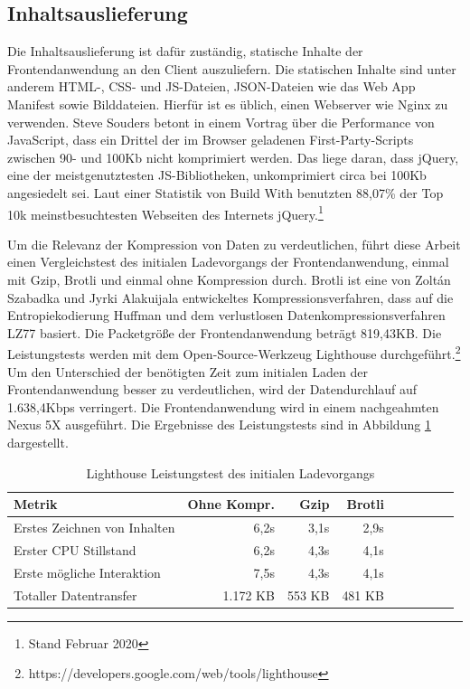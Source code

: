 \subsection{Inhaltsauslieferung}
\label{subsec:inhaltsauslieferung}
Die Inhaltsauslieferung ist dafür zuständig, statische Inhalte der Frontendanwendung
an den Client auszuliefern. Die statischen Inhalte sind unter anderem
HTML-, CSS- und JS-Dateien, JSON-Dateien wie das Web App Manifest sowie Bilddateien.
Hierfür ist es üblich, einen Webserver wie Nginx zu verwenden. Steve Souders betont
in einem Vortrag über die Performance von JavaScript, dass ein Drittel der im Browser
geladenen First-Party-Scripts zwischen 90- und 100Kb nicht komprimiert werden.
Das liege daran, dass jQuery, eine der meistgenutztesten JS-Bibliotheken,
unkomprimiert circa bei 100Kb angesiedelt sei.\cite{SteveSoudersMakeJavaScriptFaster}
Laut einer Statistik von Build With benutzten 88,07\% der Top 10k meinstbesuchtesten
Webseiten des Internets jQuery.\footnote{Stand Februar 2020}\cite{BuildWithjQuery}

Um die Relevanz der Kompression von Daten zu verdeutlichen, führt diese Arbeit einen
Vergleichstest des initialen Ladevorgangs der Frontendanwendung,
einmal mit Gzip, Brotli und einmal ohne Kompression durch. Brotli ist eine
von Zoltán Szabadka und Jyrki Alakuijala entwickeltes Kompressionsverfahren,
dass auf die Entropiekodierung Huffman und dem verlustlosen
Datenkompressionsverfahren LZ77 basiert.\cite{BrotliGoogleOpenSourceBlog}
Die Packetgröße der Frontendanwendung beträgt 819,43KB. Die Leistungstests
werden mit dem Open-Source-Werkzeug Lighthouse durchgeführt.\footnote{https://developers.google.com/web/tools/lighthouse}
Um den Unterschied der benötigten Zeit zum initialen Laden der Frontendanwendung
besser zu verdeutlichen, wird der Datendurchlauf auf 1.638,4Kbps verringert.
Die Frontendanwendung wird in einem nachgeahmten Nexus 5X ausgeführt.
Die Ergebnisse des Leistungstests sind in Abbildung \ref{tab:lighthouseleistungstestdesinitialenladevorgangs}
dargestellt.

\begin{table}[h]
    \begin{center}
\begin{tabular}{l*{8}{r}}
Metrik & Ohne Kompr. & Gzip & Brotli \\
\hline
Erstes Zeichnen von Inhalten& 6,2s  & 3,1s & 2,9s \\
Erster CPU Stillstand       & 6,2s  & 4,3s & 4,1s \\
Erste mögliche Interaktion  & 7,5s  & 4,3s & 4,1s \\
Totaller Datentransfer      & 1.172 KB  &  553 KB & 481 KB \\
\end{tabular}
\end{center}
\caption{Lighthouse Leistungstest des initialen Ladevorgangs}
\label{tab:lighthouseleistungstestdesinitialenladevorgangs}
\end{table}



